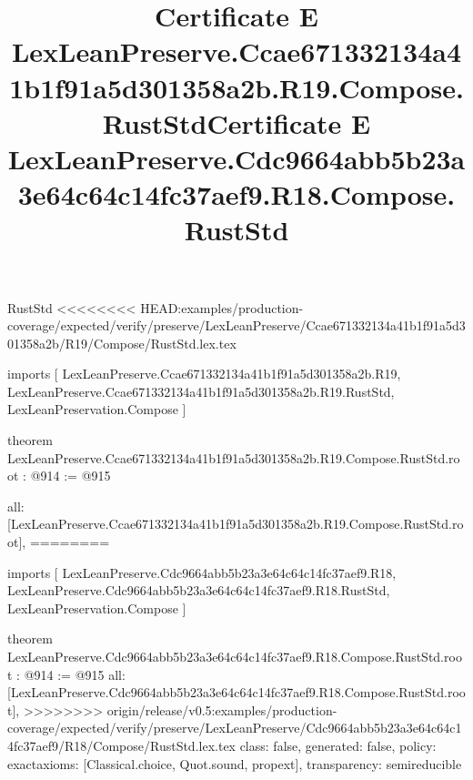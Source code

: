\begin{lexlean}{RustStd}
<<<<<<<< HEAD:examples/production-coverage/expected/verify/preserve/LexLeanPreserve/Ccae671332134a41b1f91a5d301358a2b/R19/Compose/RustStd.lex.tex
\title{Certificate E LexLeanPreserve.Ccae671332134a41b1f91a5d301358a2b.R19.Compose.RustStd}
\begin{coremodule}
imports [
  LexLeanPreserve.Ccae671332134a41b1f91a5d301358a2b.R19,
  LexLeanPreserve.Ccae671332134a41b1f91a5d301358a2b.R19.RustStd,
  LexLeanPreservation.Compose
]

theorem LexLeanPreserve.Ccae671332134a41b1f91a5d301358a2b.R19.Compose.RustStd.root : @914 := @915 {
  all: [LexLeanPreserve.Ccae671332134a41b1f91a5d301358a2b.R19.Compose.RustStd.root],
========
\title{Certificate E LexLeanPreserve.Cdc9664abb5b23a3e64c64c14fc37aef9.R18.Compose.RustStd}
\begin{coremodule}
imports [
  LexLeanPreserve.Cdc9664abb5b23a3e64c64c14fc37aef9.R18,
  LexLeanPreserve.Cdc9664abb5b23a3e64c64c14fc37aef9.R18.RustStd,
  LexLeanPreservation.Compose
]

theorem LexLeanPreserve.Cdc9664abb5b23a3e64c64c14fc37aef9.R18.Compose.RustStd.root : @914 := @915 {
  all: [LexLeanPreserve.Cdc9664abb5b23a3e64c64c14fc37aef9.R18.Compose.RustStd.root],
>>>>>>>> origin/release/v0.5:examples/production-coverage/expected/verify/preserve/LexLeanPreserve/Cdc9664abb5b23a3e64c64c14fc37aef9/R18/Compose/RustStd.lex.tex
  class: false,
  generated: false,
  policy: exact{axioms: [Classical.choice, Quot.sound, propext]},
  transparency: semireducible
}


\end{coremodule}}
\end{coremodule}
\end{lexlean}
